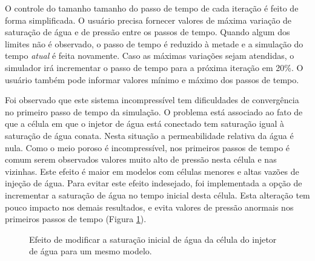 \documentclass[final,5p]{elsarticle}
\numberwithin{equation}{section}
\begin{document}
        O controle do tamanho tamanho do passo de tempo de cada iteração é feito de forma simplificada. O usuário precisa fornecer valores de máxima variação de saturação de água e de pressão entre os passos de tempo. Quando algum dos limites não é observado, o passo de tempo é reduzido à metade e a simulação do tempo \emph{atual} é feita novamente. Caso as máximas variações sejam atendidas, o simulador irá incrementar o passo de tempo para a próxima iteração em 20\%. O usuário também pode informar valores mínimo e máximo dos passos de tempo.

        Foi observado que este sistema incompressível tem dificuldades de convergência no primeiro passo de tempo da simulação. O problema está associado ao fato de que a célula em que o injetor de água está conectado tem saturação igual à saturação de água conata. Nesta situação a permeabilidade relativa da água é nula. Como o meio poroso é incompressível, nos primeiros passos de tempo é comum serem observados valores muito alto de pressão nesta célula e nas vizinhas. Este efeito é maior em modelos com células menores e altas vazões de injeção de água.
        Para evitar este efeito indesejado, foi implementada a opção de incrementar a saturação de água no tempo inicial desta célula. Esta alteração tem pouco impacto nos demais resultados, e evita valores de pressão anormais nos primeiros passos de tempo (Figura \ref{fig:ajustesw}).

        \begin{figure}[hbt!]
            \caption{Efeito de modificar a saturação inicial de água da célula do injetor de água para um mesmo modelo.}
            \label{fig:ajustesw}
        \end{figure}
\end{document}
